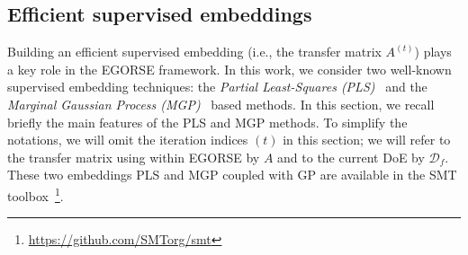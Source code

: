 {\color{black}
\subsection{Efficient supervised embeddings}

Building an efficient supervised embedding (i.e., the transfer matrix $A^{(t)}$) plays a key role in the EGORSE framework. In this work, we consider two well-known supervised embedding techniques: the \textit{Partial Least-Squares (PLS)}~\cite{hellandStructurePartialLeast1988} and the \textit{Marginal Gaussian Process (MGP)}~\cite{GarnettActiveLearningLinear2014} based methods. In this section, we recall briefly the main features of the PLS and MGP methods. To simplify the notations, we will omit the iteration indices $(t)$ in this section; we will refer to the transfer matrix using within EGORSE by $A$ and to the current DoE by $\mathcal{D}_f$. 
These two embeddings PLS and MGP coupled with GP are available in the SMT toolbox~\cite{bouhlelPythonSurrogateModeling2019,SMT2023}\footnote{\href{https://github.com/SMTorg/smt}{https://github.com/SMTorg/smt}}.


}
